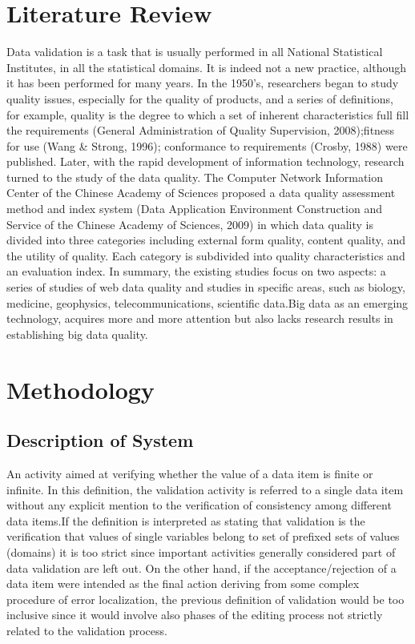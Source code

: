 \documentclass[12pt,]{article}
\begin{document}
\section{Literature Review}
Data validation is a task that is usually performed in all National Statistical Institutes, in all the statistical domains. It is indeed not a new practice, although it has been performed for many years. In the 1950's, researchers began to study quality issues, especially for the quality of products, and a series of definitions, for example, quality is the degree to which a set of inherent characteristics full fill the requirements (General Administration of Quality Supervision, 2008);fitness for use (Wang & Strong, 1996); conformance to requirements (Crosby, 1988) were published. Later, with the rapid development of information technology, research turned to the study of the data quality. 
The Computer Network Information Center of the Chinese Academy of Sciences proposed a data quality assessment method and index system (Data Application Environment Construction and Service of the Chinese Academy of Sciences, 2009) in which data quality is divided into three categories including external form quality, content quality, and the utility of quality. Each category is subdivided into quality characteristics and an evaluation index. 
In summary, the existing studies focus on two aspects: a series of studies of web data quality and studies in specific areas, such as biology, medicine, geophysics, telecommunications, scientific data.Big data as an emerging technology, acquires more and more attention but also lacks research results in establishing big data quality.

\section{Methodology}
\subsection*{Description of System}
An activity aimed at verifying whether the value of a data item is finite or infinite.
In this definition, the validation activity is referred to a single data item without any explicit mention to the verification of consistency among different data items.If the definition is interpreted as stating that validation is the verification that values of single variables belong to set of prefixed sets of values (domains) it is too strict since important activities generally considered part of data validation are left out. On the other hand, if the acceptance/rejection of a data item were intended as the final action deriving from some complex procedure of error localization, the previous definition of validation would be too inclusive since it would involve also phases of the editing process not strictly related to the validation process.
\end{document}
